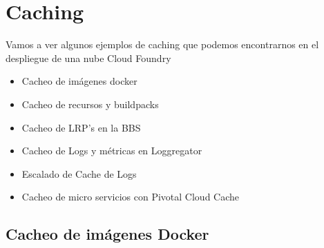 \documentclass[a4paper,11pt]{article}
\begin{document}
\section{Caching}
Vamos a ver algunos ejemplos de caching que podemos encontrarnos en el despliegue de una nube Cloud Foundry
\begin{itemize}
  \item Cacheo de imágenes docker
  \item Cacheo de recursos y buildpacks
  \item Cacheo de LRP’s en la BBS
    \item Cacheo de Logs y métricas en Loggregator
      \item Escalado de Cache de Logs
      \item Cacheo de micro servicios con Pivotal Cloud Cache
\end{itemize}
\subsection{Cacheo de imágenes Docker}
\end{document}
